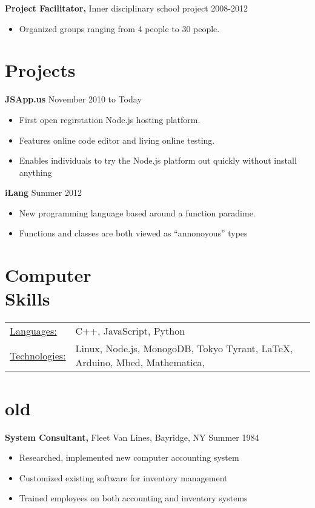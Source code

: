 \documentclass[margin]{res}
\begin{document}
\begin{resume}
{\bf Project Facilitator,} Inner disciplinary school project \hfill 2008-2012
\begin{itemize} \itemsep -2pt
  \item Organized groups ranging from 4 people to 30 people.
\end{itemize}

\section{Projects}
{\bf JSApp.us} \hfill November 2010 to Today
\begin{itemize} \itemsep -2pt
  \item First open regirstation Node.js hosting platform.
  \item Features online code editor and living online testing.
  \item Enables individuals to try the Node.js platform out quickly without install anything
\end{itemize}

{\bf iLang} \hfill Summer 2012
\begin{itemize} \itemsep -2pt
  \item New programming language based around a function paradime.
  \item Functions and classes are both viewed as ``annonoyous'' types
\end{itemize}

\section{Computer \\ Skills}
   \begin{tabular}{l p{3in}}
    \underline{Languages:} & C++, JavaScript, Python \\

     \underline{Technologies:} & Linux, Node.js, MonogoDB, Tokyo Tyrant, \LaTeX, Arduino, Mbed, Mathematica,
 \end{tabular}

\section{old}
{\bf System Consultant,} Fleet Van Lines, Bayridge, NY \hfill  Summer 1984
\begin{itemize} \itemsep -2pt %
\item Researched, implemented new computer accounting
  system
\item Customized existing software for inventory
                 management
\item Trained employees on both accounting and inventory
                 systems
\end{itemize}


\end{resume}
\end{document}
